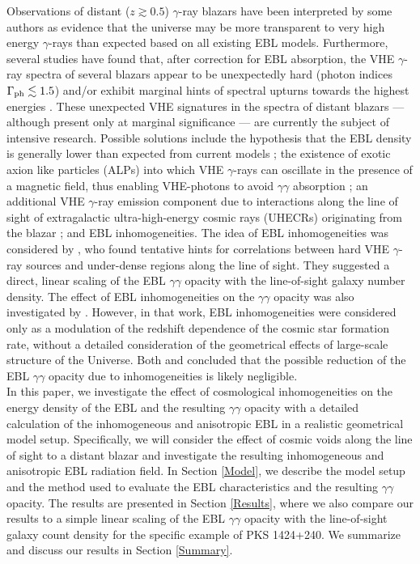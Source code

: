 \documentclass{aastex6}
\begin{document}
Observations of distant ($z \gtrsim 0.5$) $\gamma$-ray blazars have been interpreted by some authors 
\citep[e.g.,][]{Albert08,Archambault14} as evidence that the universe may be more transparent to very high 
energy $\gamma$-rays than expected based on all existing EBL models. Furthermore, several studies have
found that, after correction for EBL absorption, the VHE $\gamma$-ray spectra of several blazars appear
to be unexpectedly hard (photon indices $\Gamma_{\rm ph} \lesssim 1.5$) and/or exhibit marginal hints of 
spectral upturns towards the highest energies \citep[e.g.,][]{Finke10,Furniss13}. These unexpected VHE 
signatures in the spectra of distant blazars --- although present only at marginal significance --- are 
currently the subject of intensive research. 
Possible solutions include the  
hypothesis that the EBL density is generally lower than expected from current models \citep{Furniss13}; 
the existence of exotic axion like particles (ALPs) into which VHE $\gamma$-rays can oscillate in the 
presence of a magnetic field, thus enabling VHE-photons to avoid $\gamma\gamma$ absorption \citep{Dominguez11b}; 
an additional VHE $\gamma$-ray emission component due to interactions along the line of sight of 
extragalactic ultra-high-energy cosmic rays (UHECRs) originating from the blazar \citep[e.g.,][]{EK10}; 
and EBL inhomogeneities. The idea of EBL inhomogeneities was considered by \cite{Furniss15}, who 
found tentative hints for correlations between hard VHE $\gamma$-ray sources and under-dense regions 
along the line of sight. They suggested a direct, linear scaling of the EBL $\gamma\gamma$ opacity with
the line-of-sight galaxy number density. The effect of EBL inhomogeneities 
on the $\gamma\gamma$ opacity was also investigated by \cite{KF16}. However, in that work, EBL inhomogeneities
were considered only as a modulation of the redshift dependence of the cosmic star formation rate,
without a detailed consideration of the geometrical effects of large-scale structure of the Universe.
Both \cite{Furniss15} and \cite{KF16} concluded that the possible reduction of the EBL $\gamma\gamma$ 
opacity due to inhomogeneities is likely negligible.  \\

In this paper, we investigate the effect of cosmological inhomogeneities on the energy density of
the EBL and the resulting $\gamma\gamma$ opacity  with a detailed calculation of the inhomogeneous
and anisotropic EBL in a realistic geometrical model setup. Specifically, we will consider the effect of 
cosmic voids
along the line of sight to a distant blazar and investigate the resulting inhomogeneous
and anisotropic EBL radiation field. In Section \ref{Model}, we describe the model setup and the
method used to evaluate the EBL characteristics and the resulting $\gamma\gamma$ opacity. The results 
are presented in Section \ref{Results}, where we also compare our results to a
simple linear scaling of the EBL $\gamma\gamma$ opacity with the line-of-sight galaxy count density
for the specific example of PKS 1424+240.
We summarize and discuss our results in Section \ref{Summary}. 
\end{document}
